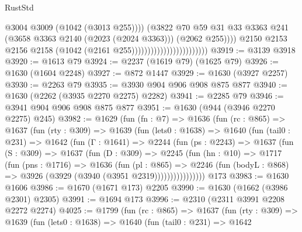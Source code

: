 \begin{lexlean}{RustStd}
\begin{coremodule}
                                                        @3004
                                                        @3009
                                                        (@1042 (@3013 @255))))
                                                    (@3822
                                                      @70
                                                      @59
                                                      @31
                                                      @33
                                                      @3363
                                                      @241
                                                      (@3658 @3363 @2140 (@2023 (@2024 @3363)))
                                                      (@2062 @255))))
                                                @2150
                                                @2153
                                                @2156
                                                @2158
                                                (@1042 (@2161 @255))))))))))))))))))))))))
@3919 := @3139 @3918
@3920 := @1613 @79
@3924 := @2237 (@1619 @79) (@1625 @79)
@3926 := @1630 (@1604 @2248)
@3927 := @872 @1447
@3929 := @1630 (@3927 @2257)
@3930 := @2263 @79
@3935 := @3930 @904 @906 @908 @875 @877
@3940 := @1630 (@2262 (@3935 @2270 @2275) @2282)
@3941 := @2285 @79
@3946 := @3941 @904 @906 @908 @875 @877
@3951 := @1630 (@944 (@3946 @2270 @2275) @245)
@3982 := @1629
    (fun (fn : @7) =>
    @1636
      (fun (rc : @865) =>
      @1637
        (fun (rty : @309) =>
        @1639
          (fun (lets0 : @1638) =>
          @1640
            (fun (tail0 : @231) =>
            @1642
              (fun (Γ : @1641) =>
              @2244
                (fun (ps : @2243) =>
                @1637
                  (fun (S : @309) =>
                  @1637
                    (fun (D : @309) =>
                    @2245
                      (fun (hn : @10) =>
                      @1717
                        (fun (pns : @1716) =>
                        @1636
                          (fun (pl : @865) =>
                          @2246
                            (fun (bodyL : @868) => @3926 (@3929 (@3940 (@3951 @2319))))))))))))))))
    @173
@3983 := @1630 @1606
@3986 := @1670 (@1671 @173) @2205
@3990 := @1630 (@1662 (@3986 @2301) @2305)
@3991 := @1694 @173
@3996 := @2310 (@2311 @3991 @2208 @2272 @2274)
@4025 := @1799
    (fun (rc : @865) =>
    @1637
      (fun (rty : @309) =>
      @1639
        (fun (lets0 : @1638) =>
        @1640
          (fun (tail0 : @231) =>
          @1642

\end{coremodule}
\end{lexlean}
